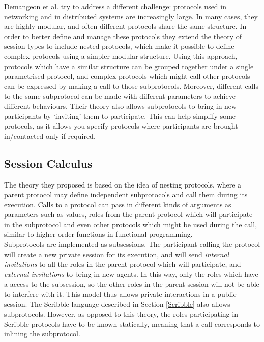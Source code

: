 \documentclass[12pt,twoside]{report}
\begin{document}
Demangeon et al.\cite{nestedprotocols} try to address a different challenge: protocols used in networking and in distributed systems are increasingly large. In many cases, they are highly modular, and often different protocols share the same structure. In order to better define and manage these protocols they extend the theory of session types to include nested protocols, which make it possible to define complex protocols using a simpler modular structure. Using this approach, protocols which have a similar structure can be grouped together under a single parametrised protocol, and complex protocols which might call other protocols can be expressed by making a call to those subprotocols. Moreover, different calls to the same subprotocol can be made with different parameters to achieve different behaviours. Their theory also allows subprotocols to bring in new participants by `inviting' them to participate. This can help simplify some protocols, as it allows you specify protocols where participants are brought in/contacted only if required.

\subsection{Session Calculus}
The theory they proposed is based on the idea of nesting protocols, where a parent protocol may define independent subprotocols and call them during its execution. Calls to a protocol can pass in different kinds of arguments as parameters such as values, roles from the parent protocol which will participate in the subprotocol and even other protocols which might be used during the call, similar to higher-order functions in functional programming.\\ 

Subprotocols are implemented as subsessions. The participant calling the protocol will create a new private session for its execution, and will send \textit{internal invitations} to all the roles in the parent protocol which will participate, and \textit{external invitations} to bring in new agents. In this way, only the roles which have a access to the subsession, so the other roles in the parent session will not be able to interfere with it. This model thus allows private interactions in a public session. The Scribble language described in Section \ref{Scribble} also allows subprotocols. However, as opposed to this theory, the roles participating in Scribble protocols have to be known statically, meaning that a call corresponds to inlining the subprotocol.\\
\end{document}
